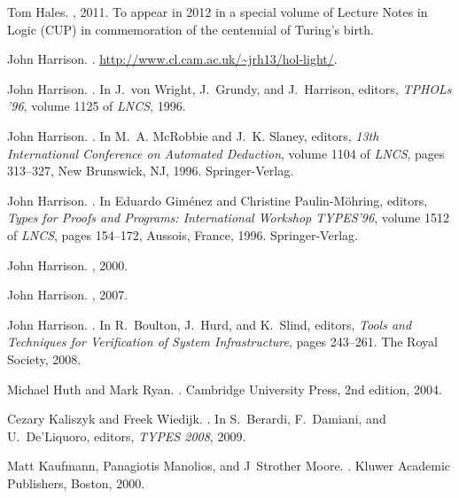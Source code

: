 \documentclass{LMCS}
\begin{document}
\begin{thebibliography}{10}
Tom Hales.
, 2011.
\newblock To appear in 2012 in a special volume of Lecture Notes in Logic (CUP)
  in commemoration of the centennial of Turing's birth.

John Harrison.
.
\newblock \url{http://www.cl.cam.ac.uk/~jrh13/hol-light/}.

John Harrison.
.
\newblock In J.~von Wright, J.~Grundy, and J.~Harrison, editors, {\em TPHOLs
  '96}, volume 1125 of {\em LNCS}, 1996.

John Harrison.
.
\newblock In M.~A. McRobbie and J.~K. Slaney, editors, {\em 13th International
  Conference on Automated Deduction}, volume 1104 of {\em LNCS}, pages
  313--327, New Brunswick, NJ, 1996. Springer-Verlag.

John Harrison.
.
\newblock In Eduardo Gim{\'e}nez and Christine Paulin-M{\"o}hring, editors,
  {\em Types for Proofs and Programs: International Workshop {TYPES'96}},
  volume 1512 of {\em LNCS}, pages 154--172, Aussois, France, 1996.
  Springer-Verlag.

John Harrison.
, 2000.

John Harrison.
, 2007.

John Harrison.
.
\newblock In R.~Boulton, J.~Hurd, and K.~Slind, editors, {\em {Tools and
  Techniques for Verification of System Infrastructure}}, pages 243--261. The
  Royal Society, 2008.

Michael Huth and Mark Ryan.
.
\newblock Cambridge University Press, 2nd edition, 2004.

Cezary Kaliszyk and Freek Wiedijk.
.
\newblock In S.~Berardi, F.~Damiani, and U.~De'Liquoro, editors, {\em {TYPES
  2008}}, 2009.

Matt Kaufmann, Panagiotis Manolios, and J~Strother Moore.
.
\newblock Kluwer Academic Publishers, Boston, 2000.


\end{thebibliography}
\end{document}
